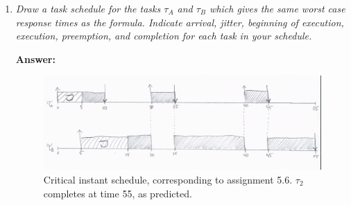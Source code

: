\documentclass[a4paper,10pt]{article}
\newcommand{\answer}{\textbf{Answer: }}
\begin{document}
\begin{enumerate}
	\answer From the FpsCalc code in the previous excercise, we also get the worst case execution time for the tasks when taking jitter into account. The values calculated by the \texttt{WCRespTimeJitter} formula gives us the response times $R_A = 10 ms$ and $R_B = 55 ms$. Since the deadlines for the tasks are $D_A = 10 ms$ and $D_B = 50$, $\tau_B$ will miss its deadline.

	\item \emph{Draw a task schedule for the tasks $\tau_A$ and $\tau_B$ which gives the same worst case response times as the formula. Indicate arrival, jitter, beginning of execution, execution, preemption, and completion for each task in your schedule.}
	
	\answer
	\begin{figure}
	\includegraphics[scale=0.4]{5_6_low}
	\caption{Critical instant schedule, corresponding to assignment 5.6. $\tau_2$ completes at time 55, as predicted.}
	\label{5_6}
	\end{figure}
\end{enumerate}
\end{document}
